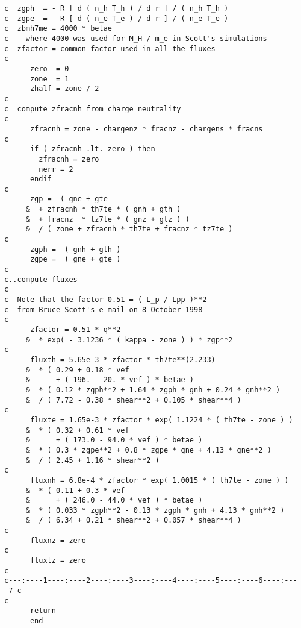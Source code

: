 \begin{verbatim}
c  zgph  = - R [ d ( n_h T_h ) / d r ] / ( n_h T_h )
c  zgpe  = - R [ d ( n_e T_e ) / d r ] / ( n_e T_e )
c  zbmh7me = 4000 * betae
c    where 4000 was used for M_H / m_e in Scott's simulations
c  zfactor = common factor used in all the fluxes
c
      zero  = 0
      zone  = 1
      zhalf = zone / 2
c
c  compute zfracnh from charge neutrality
c
      zfracnh = zone - chargenz * fracnz - chargens * fracns
c
      if ( zfracnh .lt. zero ) then
        zfracnh = zero
        nerr = 2
      endif
c
      zgp =  ( gne + gte
     &  + zfracnh * th7te * ( gnh + gth )
     &  + fracnz  * tz7te * ( gnz + gtz ) )
     &  / ( zone + zfracnh * th7te + fracnz * tz7te )
c
      zgph =  ( gnh + gth )
      zgpe =  ( gne + gte )
c
c..compute fluxes
c
c  Note that the factor 0.51 = ( L_p / Lpp )**2
c  from Bruce Scott's e-mail on 8 October 1998
c
      zfactor = 0.51 * q**2
     &  * exp( - 3.1236 * ( kappa - zone ) ) * zgp**2
c
      fluxth = 5.65e-3 * zfactor * th7te**(2.233)
     &  * ( 0.29 + 0.18 * vef
     &      + ( 196. - 20. * vef ) * betae )
     &  * ( 0.12 * zgph**2 + 1.64 * zgph * gnh + 0.24 * gnh**2 )
     &  / ( 7.72 - 0.38 * shear**2 + 0.105 * shear**4 )
c
      fluxte = 1.65e-3 * zfactor * exp( 1.1224 * ( th7te - zone ) )
     &  * ( 0.32 + 0.61 * vef
     &      + ( 173.0 - 94.0 * vef ) * betae )
     &  * ( 0.3 * zgpe**2 + 0.8 * zgpe * gne + 4.13 * gne**2 )
     &  / ( 2.45 + 1.16 * shear**2 )
c
      fluxnh = 6.8e-4 * zfactor * exp( 1.0015 * ( th7te - zone ) )
     &  * ( 0.11 + 0.3 * vef
     &      + ( 246.0 - 44.0 * vef ) * betae )
     &  * ( 0.033 * zgph**2 - 0.13 * zgph * gnh + 4.13 * gnh**2 )
     &  / ( 6.34 + 0.21 * shear**2 + 0.057 * shear**4 )
c
      fluxnz = zero
c
      fluxtz = zero
c
c---:----1----:----2----:----3----:----4----:----5----:----6----:----7-c
c
      return
      end
\end{verbatim}


